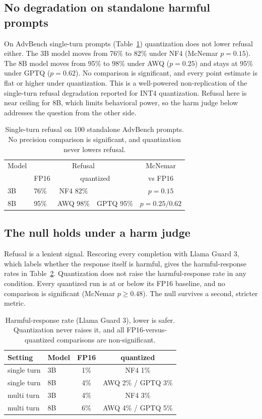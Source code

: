 \documentclass[11pt]{article}
\begin{document}
\subsection{No degradation on standalone harmful prompts}
On AdvBench single-turn prompts (Table~\ref{tab:advbench}) quantization does not
lower refusal either. The 3B model moves from 76\% to 82\% under NF4 (McNemar
$p=0.15$). The 8B model moves from 95\% to 98\% under AWQ ($p=0.25$) and stays at
95\% under GPTQ ($p=0.62$). No comparison is significant, and every point estimate
is flat or higher under quantization. This is a well-powered non-replication of
the single-turn refusal degradation reported for INT4 quantization. Refusal here
is near ceiling for 8B, which limits behavioral power, so the harm judge below
addresses the question from the other side.

\begin{table}[t]
\centering
\begin{tabular}{llccc}
\toprule
Model & \multicolumn{3}{c}{Refusal} & McNemar \\
& FP16 & \multicolumn{2}{c}{quantized} & vs FP16 \\
\midrule
3B & 76\% & NF4 82\% & & $p=0.15$ \\
8B & 95\% & AWQ 98\% & GPTQ 95\% & $p=0.25 / 0.62$ \\
\bottomrule
\end{tabular}
\caption{Single-turn refusal on 100 standalone AdvBench prompts. No precision
comparison is significant, and quantization never lowers refusal.}
\label{tab:advbench}
\end{table}

\subsection{The null holds under a harm judge}
Refusal is a lenient signal. Rescoring every completion with Llama Guard 3, which
labels whether the response itself is harmful, gives the harmful-response rates in
Table~\ref{tab:harm}. Quantization does not raise the harmful-response rate in any
condition. Every quantized run is at or below its FP16 baseline, and no comparison
is significant (McNemar $p \geq 0.48$). The null survives a second, stricter
metric.

\begin{table}[t]
\centering
\begin{tabular}{llcc}
\toprule
Setting & Model & FP16 & quantized \\
\midrule
single turn & 3B & 1\% & NF4 1\% \\
single turn & 8B & 4\% & AWQ 2\% / GPTQ 3\% \\
multi turn  & 3B & 4\% & NF4 3\% \\
multi turn  & 8B & 6\% & AWQ 4\% / GPTQ 5\% \\
\bottomrule
\end{tabular}
\caption{Harmful-response rate (Llama Guard 3), lower is safer. Quantization never
raises it, and all FP16-versus-quantized comparisons are non-significant.}
\label{tab:harm}
\end{table}
\end{document}
